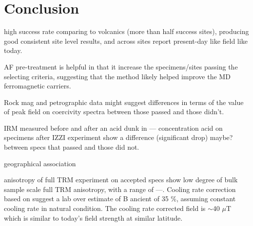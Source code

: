 \documentclass[draft]{agujournal2019}
\begin{document}






\section*{Conclusion}
high success rate comparing to volcanics (more than half success sites), producing good consistent site level results, and across sites report present-day like field like today.

AF pre-treatment is helpful in that it increase the specimens/sites passing the selecting criteria, suggesting that the method likely helped improve the MD ferromagnetic carriers. 

Rock mag and petrographic data might suggest differences in terms of the value of peak field on coercivity spectra between those passed and those didn't.  

IRM measured before and after an acid dunk in --- concentration acid on specimens after IZZI experiment show a difference (significant drop) maybe? between specs that passed and those did not.

geographical association

anisotropy of full TRM experiment on accepted specs show low degree of bulk sample scale full TRM anisotropy, with a range of ---. Cooling rate correction based on \cite{Halgedahl1980a} suggest a lab over estimate of B ancient of 35 \%, assuming constant cooling rate in natural condition. The cooling rate corrected field is $\sim$40 $\mu$T which is similar to today's field strength at similar latitude. 
\end{document}
